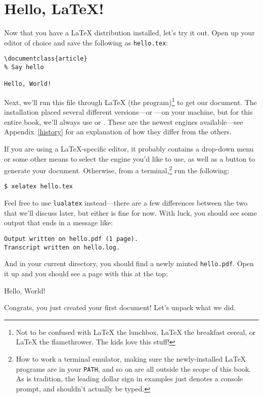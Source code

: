 \chapter{Hello, \texorpdfstring{\LaTeX}{LaTeX}!}

Now that you have a \LaTeX{} distribution installed,
let's try it out.
Open up your editor of choice and save the following as \texttt{hello.tex}:
\begin{leftfigure}
\begin{lstlisting}
\documentclass{article}
% Say hello

Hello, World!

\end{lstlisting}
\end{leftfigure}
Next, we'll run this file through \LaTeX{} (the program)\footnote{Not to be
confused with \LaTeX{} the lunchbox, \LaTeX{} the breakfast cereal,
or \LaTeX{} the flamethrower. The kids love this stuff!}
to get our document.
The installation placed several different versions---or
---on your machine,
but for this entire book, we'll always use \LuaLaTeX{} or \XeLaTeX.
These are the newest engines available---see Appendix~\ref{history} for an
explanation of how they differ from the others.

If you are using a \LaTeX{}-specific editor, it probably contains a drop-down
menu or some other means to select the engine you'd like to use,
as well as a button to generate your document.
Otherwise, from a terminal,\punckern\footnote{How to work a terminal emulator,
making sure the newly-installed \LaTeX{} programs are in your \texttt{PATH},
and so on are all outside the scope of this book.
As is tradition, the leading dollar sign in examples just denotes a console
prompt, and shouldn't actually be typed.}
run the following:
\begin{leftfigure}
\begin{lstlisting}
$ xelatex hello.tex
\end{lstlisting}
\end{leftfigure}
Feel free to use \texttt{lualatex} instead---there are a few differences
between the two that we'll discuss later, but either is fine for now.
With luck, you should see some output that ends in a message like:
\begin{leftfigure}
\begin{lstlisting}
Output written on hello.pdf (1 page).
Transcript written on hello.log.
\end{lstlisting}
\end{leftfigure}
And in your current directory, you should find a newly minted \texttt{hello.pdf}.
Open it up and you should see a page with this at the top:
\begin{leftfigure}
\lm Hello, World!
\end{leftfigure}
Congrats,
you just created your first document!
Let's unpack what we did.

